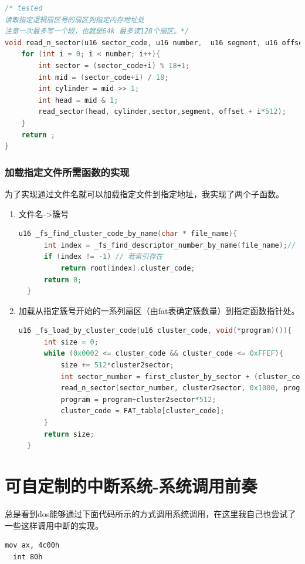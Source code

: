 \documentclass[forprint]{WHUBachelor}
\begin{document}
\begin{lstlisting}[language=c] 
/* tested
读取指定逻辑扇区号的扇区到指定内存地址处
注意一次最多写一个段，也就是64k 最多读128个扇区。*/
void read_n_sector(u16 sector_code, u16 number,  u16 segment, u16 offset){
    for (int i = 0; i < number; i++){
        int sector = (sector_code+i) % 18+1;
        int mid = (sector_code+i) / 18;
        int cylinder = mid >> 1;
        int head = mid & 1;
        read_sector(head, cylinder,sector,segment, offset + i*512);
    }
    return ;
}
\end{lstlisting}

\subsubsection{加载指定文件所需函数的实现}

为了实现通过文件名就可以加载指定文件到指定地址，我实现了两个子函数。

\begin{enumerate}
  \item 文件名->簇号
  \begin{lstlisting}[language=c] 
    u16 _fs_find_cluster_code_by_name(char * file_name){
      int index = _fs_find_descriptor_number_by_name(file_name);// 实现从文件名找到对应的文件描述符索引
      if (index != -1) // 若索引存在
          return root[index].cluster_code;
      return 0;
  }
  \end{lstlisting}
  \item 加载从指定簇号开始的一系列扇区（由fat表确定簇数量）到指定函数指针处。
  \begin{lstlisting}[language=c] 
  u16 _fs_load_by_cluster_code(u16 cluster_code, void(*program)()){
      int size = 0;
      while (0x0002 <= cluster_code && cluster_code <= 0xFFEF){
          size += 512*cluster2sector;
          int sector_number = first_cluster_by_sector + (cluster_code-2)*cluster2sector;
          read_n_sector(sector_number, cluster2sector, 0x1000, program);
          program = program+cluster2sector*512;
          cluster_code = FAT_table[cluster_code];
      }
      return size;
  }
  \end{lstlisting}
\end{enumerate}


\section{可自定制的中断系统-系统调用前奏}

总是看到dos能够通过下面代码所示的方式调用系统调用，在这里我自己也尝试了一些这样调用中断的实现。
\begin{lstlisting}[language={[x86masm]Assembler}]
  mov ax, 4c00h
  int 80h
\end{lstlisting}
\end{document}
